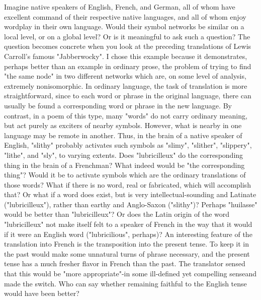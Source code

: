 Imagine native speakers of English, French, and German, all of whom have excellent
command of their respective native languages, and all of whom enjoy wordplay in their
own language. Would their symbol networks be similar on a local level, or on a global
level? Or is it meaningful to ask such a question? The question becomes concrete when
you look at the preceding translations of Lewis Carroll's famous "Jabberwocky".
        I chose this example because it demonstrates, perhaps better than an example in
ordinary prose, the problem of trying to find "the same node" in two different networks
which are, on some level of analysis, extremely nonisomorphic. In ordinary language, the
task of translation is more straightforward, since to each word or phrase in the original
language, there can usually be found a corresponding word or phrase in the new
language. By contrast, in a poem of this type, many "words" do not carry ordinary
meaning, but act purely as exciters of nearby symbols. However, what is nearby in one
language may be remote in another.
        Thus, in the brain of a native speaker of English, "slithy" probably activates such
symbols as "slimy", "slither", "slippery", "lithe", and "sly", to varying extents. Does
"lubricilleux" do the corresponding thing in the brain of a Frenchman? What indeed
would be "the corresponding thing"? Would it be to activate symbols which are the
ordinary translations of those words? What if there is no word, real or fabricated, which
will accomplish that? Or what if a word does exist, but is very intellectual-sounding and
Latinate ("lubricilleux"), rather than earthy and Anglo-Saxon ("slithy")? Perhaps
"huilasse" would be better than "lubricilleux"? Or does the Latin origin of the word
"lubricilleux" not make itself felt to a speaker of French in the way that it would if it were
an English word ("lubricilious", perhaps)?
        An interesting feature of the translation into French is the transposition into the
present tense. To keep it in the past would make some unnatural turns of phrase
necessary, and the present tense has a much fresher flavor in French than the past. The
translator sensed that this would be "more appropriate"-in some ill-defined yet
compelling senseand made the switch. Who can say whether remaining faithful to the
English tense would have been better?





